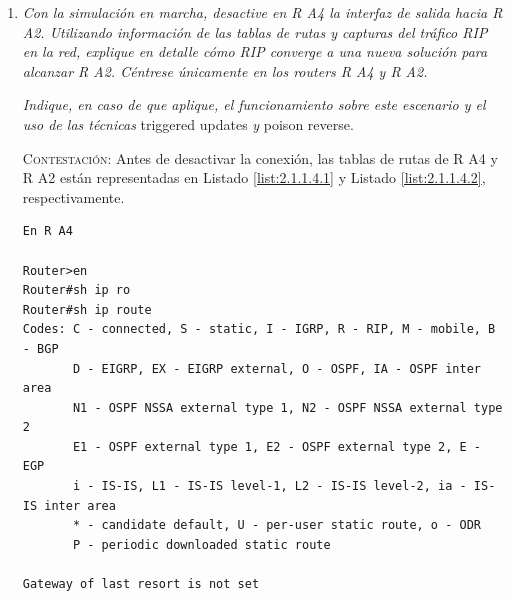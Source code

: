 \documentclass[twoside, 11pt]{article}
\begin{document}
\begin{enumerate}
\begin{center}
\begin{verbatim}
Trace complete.
\end{verbatim}
\label{list:2.1.1.3}
\end{center}

\item \textit{Con la simulación en marcha, desactive en R A4 la interfaz de salida
hacia R A2. Utilizando información de las tablas de rutas y capturas
del tráfico RIP en la red, explique en detalle cómo RIP converge a una
nueva solución para alcanzar R A2. Céntrese únicamente en los
routers R A4 y R A2.}

\textit{Indique, en caso de que aplique, el funcionamiento sobre este
escenario y el uso de las técnicas} triggered updates \textit{y} poison reverse.
\label{ej:2.1.1.4}

\vspace{7px}

\textsc{Contestación}: Antes de desactivar la conexión, las tablas de rutas de R A4 y R A2 están representadas en Listado \ref{list:2.1.1.4.1} y Listado \ref{list:2.1.1.4.2}, respectivamente.

\begin{center}
\begin{verbatim}
En R A4

Router>en
Router#sh ip ro
Router#sh ip route 
Codes: C - connected, S - static, I - IGRP, R - RIP, M - mobile, B - BGP
       D - EIGRP, EX - EIGRP external, O - OSPF, IA - OSPF inter area
       N1 - OSPF NSSA external type 1, N2 - OSPF NSSA external type 2
       E1 - OSPF external type 1, E2 - OSPF external type 2, E - EGP
       i - IS-IS, L1 - IS-IS level-1, L2 - IS-IS level-2, ia - IS-IS inter area
       * - candidate default, U - per-user static route, o - ODR
       P - periodic downloaded static route

Gateway of last resort is not set


\end{verbatim}
\end{center}
\end{enumerate}
\end{document}
